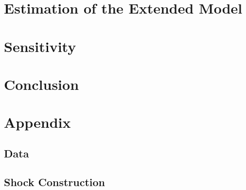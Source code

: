 \documentclass[12pt,a4paper,leqno]{article}
\begin{document}
\section{Estimation of the Extended Model}
\label{sec:estimation_extended_model}

\section{Sensitivity}
\label{sec:sensitivity}

\section{Conclusion}
\label{sec:conclusion}

\newpage
\vfill
{}




\newpage
\appendix
\section*{Appendix}
\renewcommand{\thesubsection}{\Alph{subsection}}
\setcounter{table}{0}
\renewcommand{\thetable}{A\arabic{table}}


\subsection{Data}
\label{sec:appendix_data}


\subsection{Shock Construction}
\label{sec:appendix_shock_construction}

\end{document}
